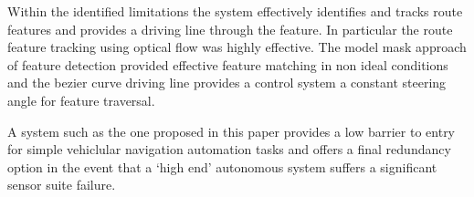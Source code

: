 \documentclass[]{aiaa-tc}%
\begin{document}
Within the identified limitations the system effectively identifies and tracks route features and provides a driving line through the feature. In particular the route feature tracking using optical flow was highly effective. The model mask approach of feature detection provided effective feature matching in non ideal conditions and the bezier curve driving line provides a control system a constant steering angle for feature traversal.

A system such as the one proposed in this paper provides a low barrier to entry for simple vehiclular navigation automation tasks and offers a final redundancy option in the event that a `high end' autonomous system suffers a significant sensor suite failure.


\newpage

%
%
\end{document}
